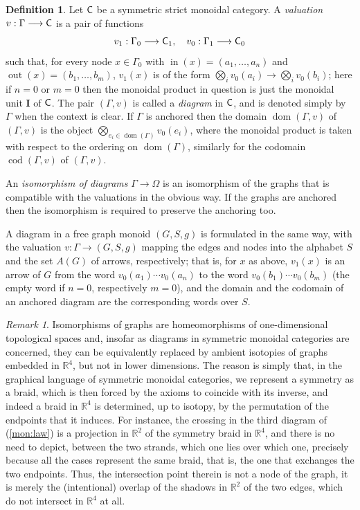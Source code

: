 \documentclass[12pt]{amsart}
\theoremstyle{plain}
\theoremstyle{definition}
\newtheorem{defn}[thm]{Definition}
\theoremstyle{remark}
\newtheorem{rem}[thm]{Remark}
\numberwithin{equation}{section}
\theoremstyle{plain}
\DeclareMathOperator{\dom}{dom}
\DeclareMathOperator{\cod}{cod}
\newcommand{\R}{\mathds{R}}
\newcommand{\0}{\emptyset}
\newcommand{\fun}{\longrightarrow}
\DeclareMathOperator{\out}{out}
\newcommand{\cat}[1]{\textup{\textsf{#1}}}
\newcommand{\memph}[1]{{\color{magenta}\emph{#1}}}
\newcommand{\moi}{\mathbf{I}}
\DeclareMathOperator{\inn}{in}
\begin{document}
\begin{defn}
Let $\cat C$ be a symmetric strict monoidal category. A \memph{valuation} $v : \Gamma \fun \cat C$ is a pair of functions
\[
v_1 : \Gamma_0 \fun \cat C_1, \quad v_0 : \Gamma_1 \fun \cat C_0
\]
such that, for every node $x \in  \Gamma_0$ with $\inn(x) = (a_1, \ldots, a_n)$ and $\out(x) = (b_1, \ldots, b_m)$, $v_1(x)$ is of the form $\bigotimes_i v_0(a_i) \fun \bigotimes_i v_0(b_i)$; here if $n = 0$ or $m = 0$ then the monoidal product in question is just the monoidal unit $\moi$ of $\cat C$. The pair $(\Gamma, v)$ is called a  \memph{diagram}  in $\cat C$, and is denoted simply by $\Gamma$ when the context is clear. If $\Gamma$ is anchored then the  domain $\dom(\Gamma, v)$ of $(\Gamma, v)$ is the object $\bigotimes_{e_i \in \dom(\Gamma)} v_0(e_i)$, where the monoidal product is taken with respect to the ordering on $\dom(\Gamma)$, similarly for the codomain $\cod(\Gamma, v)$ of $(\Gamma, v)$.

An \memph{isomorphism of  diagrams} $\Gamma \fun \Omega$ is an isomorphism of the  graphs  that  is compatible with the valuations in the obvious way. If the graphs are anchored then the isomorphism is required to preserve the anchoring too.

A diagram in a free  graph monoid $(G, S, g)$ is formulated in the same way,  with the valuation $v : \Gamma \fun (G, S, g)$ mapping the edges and nodes into the alphabet $S$ and the set $A(G)$ of arrows, respectively; that is, for $x$ as above, $v_1(x)$ is an arrow of $G$ from the word $v_0(a_1) \cdots v_0(a_n)$ to the word $v_0(b_1) \cdots v_0(b_m)$ (the empty word if $n = 0$, respectively $m = 0$), and the domain and the codomain of an anchored diagram are the corresponding words over $S$.
\end{defn}


\begin{rem}\label{free:sys:mo:string}
Isomorphisms of graphs are homeomorphisms of one-dimensional topological spaces and, insofar as diagrams in  symmetric monoidal categories are concerned, they can be equivalently replaced by ambient isotopies of graphs embedded in $\R^4$, but not in lower dimensions. The reason is simply that, in the graphical language of symmetric monoidal categories,  we represent a symmetry as a braid, which is then forced by the axioms to coincide with its inverse, and indeed a braid in $\R^4$ is determined, up to isotopy, by the permutation of the endpoints that it induces. For instance, the crossing in the third diagram of (\ref{mon:law}) is  a projection in $\R^2$ of the symmetry braid in $\R^4$, and there is no need to depict, between the two strands, which one lies over which one, precisely because all the cases represent the same braid, that is, the one that exchanges the two endpoints. Thus, the intersection point therein is not a node of the graph, it is merely the (intentional) overlap of the shadows in $\R^2$ of the two edges, which do not intersect in $\R^4$ at all.
\end{rem}
\end{document}

